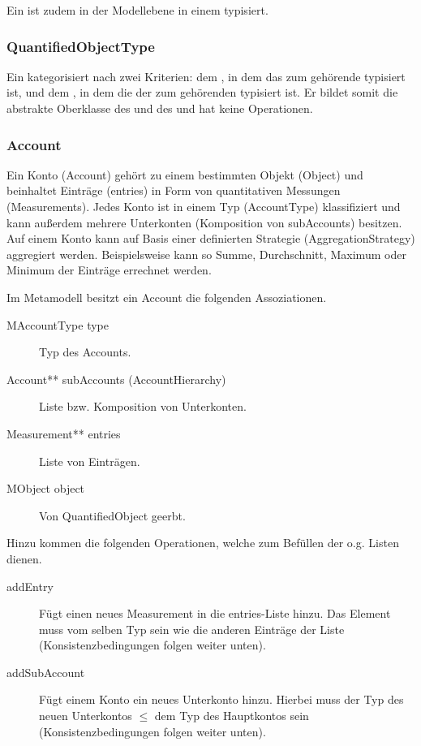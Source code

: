 Ein  ist zudem in der Modellebene in einem  typisiert.


\subsubsection{QuantifiedObjectType}
Ein  kategorisiert  nach zwei Kriterien: dem , in dem das
zum  gehörende  typisiert ist, und dem , in dem die 
der zum  gehörenden  typisiert ist. Er bildet somit die abstrakte Oberklasse des
 und des  und hat keine Operationen.


\subsubsection{Account}
Ein Konto (Account) gehört zu einem bestimmten Objekt (Object) und beinhaltet Einträge (entries) in Form von quantitativen Messungen (Measurements). 
Jedes Konto ist in einem Typ (AccountType) klassifiziert und kann außerdem mehrere Unterkonten (Komposition von subAccounts) besitzen.
Auf einem Konto kann auf Basis einer definierten Strategie (AggregationStrategy) aggregiert werden. 
Beispielsweise kann so Summe, Durchschnitt, Maximum oder Minimum der Einträge errechnet werden. 

Im Metamodell besitzt ein Account die folgenden Assoziationen.
\begin{description}
	\item[MAccountType type] Typ des Accounts.
	\item[Account** subAccounts (AccountHierarchy)] Liste bzw. Komposition von Unterkonten.
	\item[Measurement** entries] Liste von Einträgen.
	\item[MObject object] Von QuantifiedObject geerbt.
\end{description}

Hinzu kommen die folgenden Operationen, welche zum Befüllen der o.g. Listen dienen.
\begin{description}
	\item[addEntry] Fügt einen neues Measurement in die entries-Liste hinzu. Das Element muss vom selben Typ sein wie die anderen Einträge der Liste (Konsistenzbedingungen folgen weiter unten).  
	\item[addSubAccount] Fügt einem Konto ein neues Unterkonto hinzu. Hierbei muss der Typ des neuen Unterkontos $\leq$ dem Typ des Hauptkontos sein (Konsistenzbedingungen folgen weiter unten).
\end{description}


